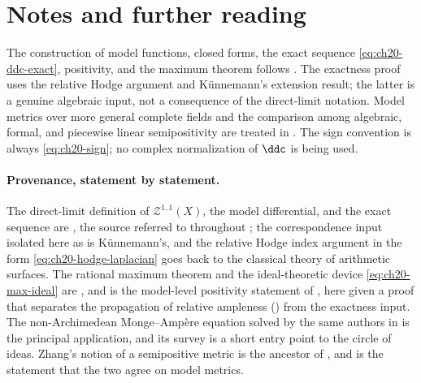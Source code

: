 \section*{Notes and further reading}

The construction of model functions, closed forms, the exact sequence
\eqref{eq:ch20-ddc-exact}, positivity, and the maximum theorem follows
\cite[Sections~2, 4, and~5]{BFJ16}.  The exactness proof uses the relative
Hodge argument and K\"unnemann's extension result; the latter is a genuine
algebraic input, not a consequence of the direct-limit notation.  Model
metrics over more general complete fields and the comparison among
algebraic, formal, and piecewise linear semipositivity are treated in
\cite{GM19}.  The sign convention is always
\eqref{eq:ch20-sign}; no complex normalization of $\ddc$ is being used.

\paragraph{Provenance, statement by statement.}
The direct-limit definition of $\mathcal Z^{1,1}(X)$, the model
differential, and the exact sequence are \cite[\S\S2 and 4]{BFJ16}, the
source referred to throughout ; the correspondence input
isolated here as  is K\"unnemann's, and the
relative Hodge index argument in the form
\eqref{eq:ch20-hodge-laplacian} goes back to the classical theory of
arithmetic surfaces.  The rational maximum theorem
 and the ideal-theoretic device
\eqref{eq:ch20-max-ideal} are \cite[\S5]{BFJ16}, and
 is the model-level positivity
statement of \cite[\S1]{BFJ16}, here given a proof that separates the
propagation of relative ampleness () from
the exactness input.  The non-Archimedean
Monge--Amp\`ere equation solved by the same authors in \cite{BFJ15} is the
principal application, and its survey \cite{BFJ16b} is a short entry point
to the circle of ideas.  Zhang's notion of a semipositive metric
\cite{Zhang1995} is the ancestor of , and
 is the statement that the two agree on
model metrics.

